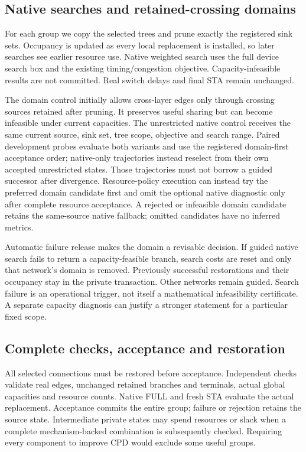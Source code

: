 \documentclass[conference,10pt]{IEEEtran}
\begin{document}
\subsection{Native searches and retained-crossing domains}
For each group we copy the selected trees and prune exactly the registered sink sets. Occupancy is updated as every local replacement is installed, so later searches see earlier resource use. Native weighted search uses the full device search box and the existing timing/congestion objective. Capacity-infeasible results are not committed. Real switch delays and final STA remain unchanged.

The domain control initially allows cross-layer edges only through crossing sources retained after pruning. It preserves useful sharing but can become infeasible under current capacities. The unrestricted native control receives the same current source, sink set, tree scope, objective and search range. Paired development probes evaluate both variants and use the registered domain-first acceptance order; native-only trajectories instead reselect from their own accepted unrestricted states. Those trajectories must not borrow a guided successor after divergence. Resource-policy execution can instead try the preferred domain candidate first and omit the optional native diagnostic only after complete resource acceptance. A rejected or infeasible domain candidate retains the same-source native fallback; omitted candidates have no inferred metrics.

Automatic failure release makes the domain a revisable decision. If guided native search fails to return a capacity-feasible branch, search costs are reset and only that network's domain is removed. Previously successful restorations and their occupancy stay in the private transaction. Other networks remain guided. Search failure is an operational trigger, not itself a mathematical infeasibility certificate. A separate capacity diagnosis can justify a stronger statement for a particular fixed scope.

\subsection{Complete checks, acceptance and restoration}
All selected connections must be restored before acceptance. Independent checks validate real edges, unchanged retained branches and terminals, actual global capacities and resource counts. Native FULL and fresh STA evaluate the actual replacement. Acceptance commits the entire group; failure or rejection retains the source state. Intermediate private states may spend resources or slack when a complete mechanism-backed combination is subsequently checked. Requiring every component to improve CPD would exclude some useful groups.
\end{document}
